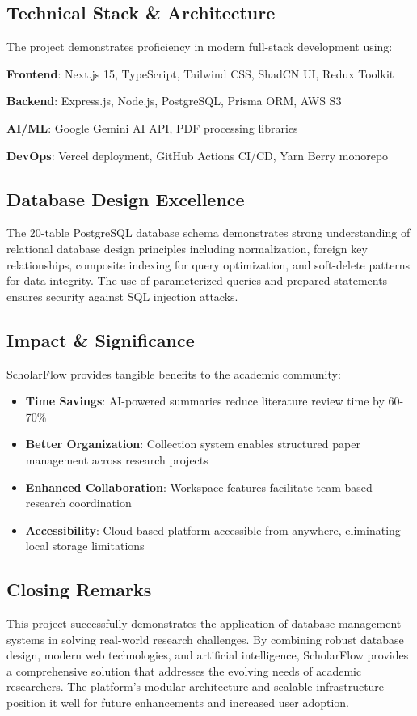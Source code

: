 \subsection{Technical Stack \& Architecture}

The project demonstrates proficiency in modern full-stack development using:

\textbf{Frontend}: Next.js 15, TypeScript, Tailwind CSS, ShadCN UI, Redux Toolkit

\textbf{Backend}: Express.js, Node.js, PostgreSQL, Prisma ORM, AWS S3

\textbf{AI/ML}: Google Gemini AI API, PDF processing libraries

\textbf{DevOps}: Vercel deployment, GitHub Actions CI/CD, Yarn Berry monorepo

\subsection{Database Design Excellence}

The 20-table PostgreSQL database schema demonstrates strong understanding of relational database design principles including normalization, foreign key relationships, composite indexing for query optimization, and soft-delete patterns for data integrity. The use of parameterized queries and prepared statements ensures security against SQL injection attacks.

\subsection{Impact \& Significance}

ScholarFlow provides tangible benefits to the academic community:

\begin{itemize}[leftmargin=*,topsep=3pt,itemsep=2pt]
    \item \textbf{Time Savings}: AI-powered summaries reduce literature review time by 60-70\%
    \item \textbf{Better Organization}: Collection system enables structured paper management across research projects
    \item \textbf{Enhanced Collaboration}: Workspace features facilitate team-based research coordination
    \item \textbf{Accessibility}: Cloud-based platform accessible from anywhere, eliminating local storage limitations
\end{itemize}

\subsection{Closing Remarks}

This project successfully demonstrates the application of database management systems in solving real-world research challenges. By combining robust database design, modern web technologies, and artificial intelligence, ScholarFlow provides a comprehensive solution that addresses the evolving needs of academic researchers. The platform's modular architecture and scalable infrastructure position it well for future enhancements and increased user adoption.
